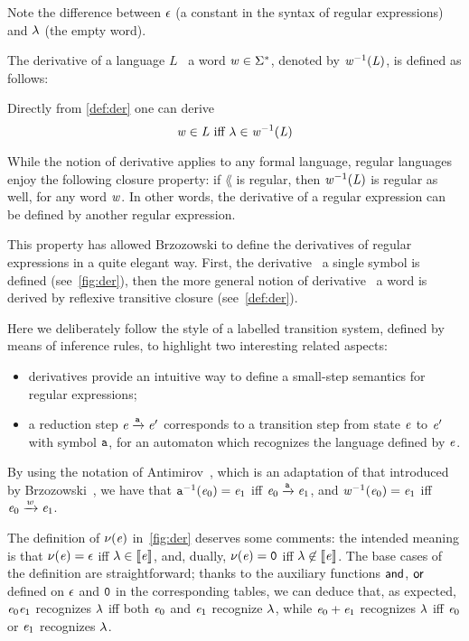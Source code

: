 Note the difference between $\mathtt {\epsilon}$ (a constant in the syntax of regular expressions) and $\lambda$ (the empty word).

The derivative of a language $L$ \wrt~a word $\mathit {w}\in\Sigma^*$, denoted by $\mathit {w}^{-1}(\mathit {L})$, is defined as follows:
Directly from \cref{def:der} one can derive
\begin{equation}
 \label{eq:der}
 \mathit {w}\in\mathit {L} \mbox{ iff }
 \lambda\in\mathit {w}^{-1}(\mathit {L})
\end{equation}

While the notion of derivative applies to any formal language, regular languages enjoy the following closure property: if $\lang$ is regular, then
$\mathit {w}^{-1}(\mathit {L})$ is regular as well, for any word $\mathit {w}$. In other words, the derivative of a regular expression can be defined by another regular expression.

This property has allowed Brzozowski to define the derivatives of regular expressions in a quite elegant way.
First, the derivative \wrt~a single symbol is defined (see~\cref{fig:der}), then
the more general notion of derivative \wrt~a word is derived by reflexive  transitive closure (see~\cref{def:der}).

Here we deliberately follow the style of a labelled transition system, defined by means of inference rules, to highlight two interesting related aspects:
\begin{itemize}
 \item derivatives provide an intuitive way to define a small-step semantics for regular expressions;
 \item a reduction step $\mathit {e}\xrightarrow{\mathtt {a}}\mathit {e}'$ corresponds to a transition step from state $\mathit {e}$ to $\mathit {e}'$ with symbol $\mathtt {a}$, for an automaton which recognizes the language defined by $\mathit {e}$.
\end{itemize}
By using the notation of Antimirov~\cite{Antimirov96}, which is an adaptation of that introduced by Brzozowski~\cite{Brzozowski64}, we have
that $\mathtt {a}^{-1}(\mathit {e}_0)=\mathit {e}_1$ iff $\mathit {e}_0\xrightarrow{\mathtt {a}}\mathit {e}_1$, and $\mathit {w}^{-1}(\mathit {e}_0)=\mathit {e}_1$ iff $\mathit {e}_0\xrightarrow{\mathit {w}}\mathit {e}_1$.

The definition of $\nu({\mathit {e}})$ in~\cref{fig:der} deserves some comments:
the intended meaning is that $\nu({\mathit {e}})=\mathtt {\epsilon}$ iff
$\lambda\in\left\llbracket{\ensuremath{\mathit {e}}}\right\rrbracket$, and, dually, $\nu({\mathit {e}})=\mathtt {0}$ iff
$\lambda\not\in\left\llbracket{\ensuremath{\mathit {e}}}\right\rrbracket$. The base cases of the definition are straightforward; thanks to the auxiliary functions $\mathbin{\mathsf{and}}$, $\mathbin{\mathsf{or}}$ defined on $\mathtt {\epsilon}$ and $\mathtt {0}$ in the corresponding tables, we can deduce that, as expected, $\mathit {e}_0\mathit {e}_1$ recognizes $\lambda$ iff both $\mathit {e}_0$ and $\mathit {e}_1$ recognize $\lambda$, while  $\mathit {e}_0\mathbin{+}\mathit {e}_1$ recognizes $\lambda$ iff $\mathit {e}_0$ or $\mathit {e}_1$ recognizes $\lambda$.

